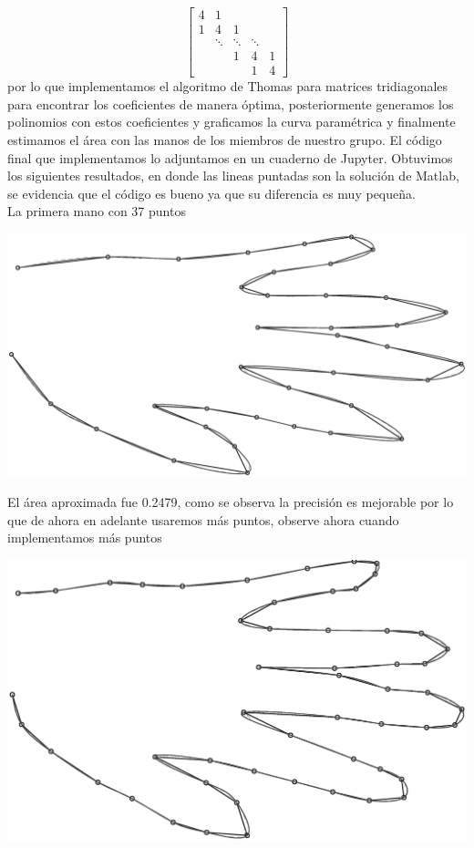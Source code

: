 \begin{solution}
$$\left[\begin{array}{ccccc}
4 & 1 & & & \\
1 & 4 & 1 & & \\
& \ddots & \ddots & \ddots & \\
& & 1 & 4 & 1 \\
& & & 1 & 4
\end{array}\right]$$
por lo que implementamos el algoritmo de Thomas para matrices tridiagonales para encontrar los coeficientes de manera óptima, posteriormente generamos los polinomios con estos coeficientes y graficamos la curva  paramétrica y finalmente estimamos el área con las manos de los miembros de nuestro grupo. El código final que implementamos lo adjuntamos en un cuaderno de Jupyter. Obtuvimos los siguientes resultados, en donde las lineas puntadas son la solución de Matlab, se evidencia que el código es bueno ya que su diferencia es muy pequeña.\\

La primera mano con 37 puntos
\begin{center}
    \includegraphics[scale=0.25]{Graficas/Mano1.eps}
\end{center}
El área aproximada fue 0.2479, como se observa la precisión es mejorable por lo que de ahora en adelante usaremos más puntos, observe ahora cuando implementamos más puntos

\begin{center}
    \includegraphics[scale=0.25]{Graficas/Mano1++.eps}
\end{center}


\end{solution}
